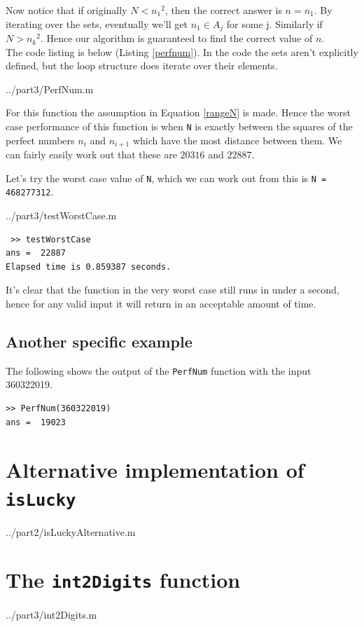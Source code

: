 \documentclass[10pt]{article}
\begin{document}
Now notice that if originally $N < {n_1}^2$, then the correct answer is $n = n_1$. By iterating over the sets, eventually we'll get $n_1 \in A_j$ for some j. Similarly if $N > {n_k}^2$. Hence our algorithm is guaranteed to find the correct value of $n$. \\

The code listing is below (Listing \ref{perfnum}). In the code the sets aren't explicitly  defined, but the loop structure does iterate over their elements.

  {../part3/PerfNum.m}
 
For this function the assumption in Equation \ref{rangeN} is made. Hence the worst case performance of this function is when \texttt{N} is exactly between the squares of the perfect numbers $n_i$ and $n_{i+1}$ which have the most distance between them. We can fairly easily work out that these are $20316$ and $22887$. 

Let's try the worst case value of \texttt{N}, which we can work out from this is \texttt{N = 468277312}.

   {../part3/testWorstCase.m}
  
 \begin{verbatim}
 >> testWorstCase
ans =  22887
Elapsed time is 0.859387 seconds.
\end{verbatim}

It's clear that the function in the very worst case still runs in under a second, hence for any valid input it will return in an acceptable amount of time.

\subsection{Another specific example}

The following shows the output of the \texttt{PerfNum} function with the input 360322019.

\begin{verbatim}
>> PerfNum(360322019)
ans =  19023
\end{verbatim}
\begin{appendices}


\section{Alternative implementation of \texttt{isLucky}}\label{islucky_appendix}

   {../part2/isLuckyAlternative.m}
  
\section{The \texttt{int2Digits} function}

   {../part3/int2Digits.m}

\end{appendices}
\end{document}
